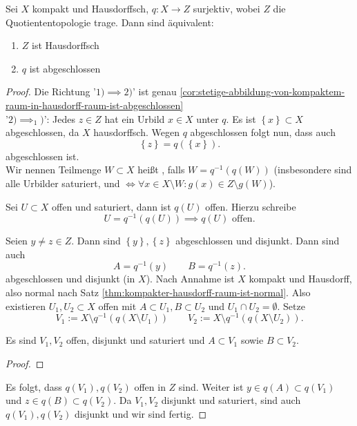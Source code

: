 \begin{theorem}\label{thm:quotientenraum-von-hausdorffraum-ist-hausdorff-gdw-projektion-abgeschlossen}
    Sei $X$ kompakt und Hausdorffsch, $q: X \to  Z$ surjektiv, wobei  $Z$ die Quotiententopologie trage. Dann sind äquivalent: 
    \begin{enumerate}[1)]
        \item $Z$ ist Hausdorffsch
        \item  $q$ ist abgeschlossen
    \end{enumerate}
\end{theorem}
\begin{proof}
    Die Richtung '$1) \implies 2)$' ist genau \autoref{cor:stetige-abbildung-von-kompaktem-raum-in-hausdorff-raum-ist-abgeschlossen} \\
    '$2)\implies_1)$': Jedes $z\in Z$ hat ein Urbild $x\in X$ unter $q$. Es ist  $\left \{x\right\} \subset X$ abgeschlossen, da $X$ hausdorffsch. Wegen  $q$ abgeschlossen folgt nun, dass auch
    \[
        \left \{z\right\}  = q(\left \{x\right\} )
    .\] 
    abgeschlossen ist. \\
    Wir nennen Teilmenge $W\subset X$ heißt , falls $W = q^{-1}(q(W))$ (insbesondere sind alle Urbilder saturiert, und $\iff  \forall x\in X \setminus W : g(x) \in Z \setminus g(W)$). \\
\begin{remark}
    Sei $U\subset X$ offen und saturiert, dann ist $q(U)$ offen. Hierzu schreibe
    \[
        U = q^{-1}(q(U)) \implies q(U) \text{ offen}
    .\] 
\end{remark}
Seien $y\neq z\in Z$. Dann sind $\left \{y\right\} ,\left \{z\right\} $ abgeschlossen und disjunkt. Dann sind auch
\[
    A = q^{-1}(y) \qquad B = q^{-1}(z)
.\] 
abgeschlossen und disjunkt (in  $X$). Nach Annahme ist  $X$ kompakt und Hausdorff, also normal nach Satz \ref{thm:kompakter-hausdorff-raum-ist-normal}. Also existieren  $U_1,U_2\subset X$ offen mit $A\subset U_1,B\subset U_2$ und $U_1 \cap U_2 = \emptyset$. Setze
\[
    V_1 := X \setminus q^{-1}(q(X\setminus U_1)) \qquad V_2 := X \setminus q^{-1}(q(X\setminus U_2))
.\] 
\begin{claim}
    Es sind $V_1,V_2$ offen, disjunkt und saturiert und $A\subset V_1$ sowie $B\subset V_2$.
\end{claim}
\begin{proof}
\end{proof}
Es folgt, dass $q(V_1),q(V_2)$ offen in $Z$ sind. Weiter ist  $y\in q(A)\subset q(V_1)$ und $z\in q(B) \subset q(V_2)$. Da $V_1,V_2$ disjunkt und saturiert, sind auch $q(V_1),q(V_2)$ disjunkt und wir sind fertig.
\end{proof}

